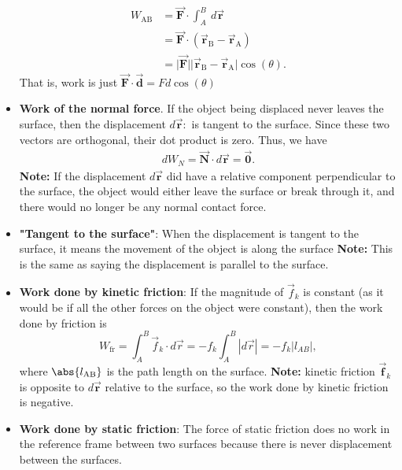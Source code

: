 \documentclass{report}
\begin{document}
\begin{itemize}
            \begin{align*}
                W_{\text{AB}} &= \vec{\mathbf{F}} \cdot \int_{A}^{B}\ d\vec{\mathbf{r}} \\
                &=\vec{\mathbf{F}} \cdot (\vec{\mathbf{r}}_{\text{B}} - \vec{\mathbf{r}}_{\text{A}}) \\
                &=\bigg\lvert \vec{\mathbf{F}} \bigg\rvert \bigg\lvert \vec{\mathbf{r}}_{\text{B}} - \vec{\mathbf{r}}_{\text{A}} \bigg\rvert\cos{\left(\theta \right)} 
            .\end{align*}
            That is, work is just $\vec{\mathbf{F}} \cdot \vec{\mathbf{d}}  = Fd\cos{\left(\theta \right)}$
        \item \textbf{Work of the normal force}. If the object being displaced never leaves the surface, then the displacement $d\vec{\mathbf{r}}: $ is tangent to the surface. Since these two vectors are orthogonal, their dot product is zero. Thus, we have
            \begin{align*}
                dW_{N} = \vec{\mathbf{N}} \cdot d\vec{\mathbf{r}} = \vec{\mathbf{0}}
            .\end{align*}
            \bigbreak \noindent 
            \textbf{Note:} If the displacement $d\vec{\mathbf{r}}$ did have a relative component perpendicular to the surface, the object would either leave the surface or break through it, and there would no longer be any normal contact force.
        \item \textbf{"Tangent to the surface"}: When the displacement is tangent to the surface, it means the movement of the object is along the surface
            \bigbreak \noindent 
            \textbf{Note:} This is the same as saying the displacement is parallel to the surface.
        \item \textbf{Work done by kinetic friction}: 
            If the magnitude of $\vec{f}_k$ is constant (as it would be if all the other forces on the object were constant), then the work done by friction is
            \[
                W_{\text{fr}} = \int_{A}^{B} \vec{f}_k \cdot d\vec{r} = -f_k \int_{A}^{B} |d\vec{r}| = -f_k |l_{AB}|,
            \]
            \bigbreak \noindent 
            where  $\abs{l_{\text{AB}}}$ is the path length on the surface.
            \bigbreak \noindent 
            \textbf{Note:} kinetic friction $\vec{\mathbf{f}}_{k}$ is opposite to $d\vec{\mathbf{r}}$ relative to the surface, so the work done by kinetic friction is negative.
        \item \textbf{Work done by static friction}: The force of static friction does no work in the reference frame between two surfaces because there is never displacement between the surfaces.

\end{itemize}
\end{document}
